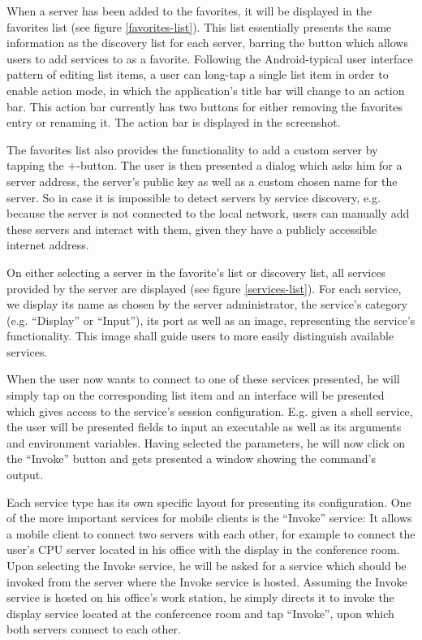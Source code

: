 When a server has been added to the favorites, it will be displayed in the favorites list (see figure \ref{favorites-list}).
This list essentially presents the same information as the discovery list for each server, barring the button which allows users to add services to as a favorite.
Following the Android-typical user interface pattern of editing list items, a user can long-tap a single list item in order to enable action mode, in which the application's title bar will change to an action bar.
This action bar currently has two buttons for either removing the favorites entry or renaming it.
The action bar is displayed in the screenshot.

The favorites list also provides the functionality to add a custom server by tapping the $+$-button.
The user is then presented a dialog which asks him for a server address, the server's public key as well as a custom chosen name for the server.
So in case it is impossible to detect servers by service discovery, e.g. because the server is not connected to the local network, users can manually add these servers and interact with them, given they have a publicly accessible internet address.

On either selecting a server in the favorite's list or discovery list, all services provided by the server are displayed (see figure \ref{services-list}).
For each service, we display its name as chosen by the server administrator, the service's category (e.g. ``Display'' or ``Input''), its port as well as an image, representing the service's functionality.
This image shall guide users to more easily distinguish available services.

When the user now wants to connect to one of these services presented, he will simply tap on the corresponding list item and an interface will be presented which gives access to the service's session configuration.
E.g. given a shell service, the user will be presented fields to input an executable as well as its arguments and environment variables.
Having selected the parameters, he will now click on the ``Invoke'' button and gets presented a window showing the command's output.

Each service type has its own specific layout for presenting its configuration.
One of the more important services for mobile clients is the ``Invoke'' service:
It allows a mobile client to connect two servers with each other, for example to connect the user's CPU server located in his office with the display in the conference room.
Upon selecting the Invoke service, he will be asked for a service which should be invoked from the server where the Invoke service is hosted.
Assuming the Invoke service is hosted on his office's work station, he simply directs it to invoke the display service located at the confercence room and tap ``Invoke'', upon which both servers connect to each other.

